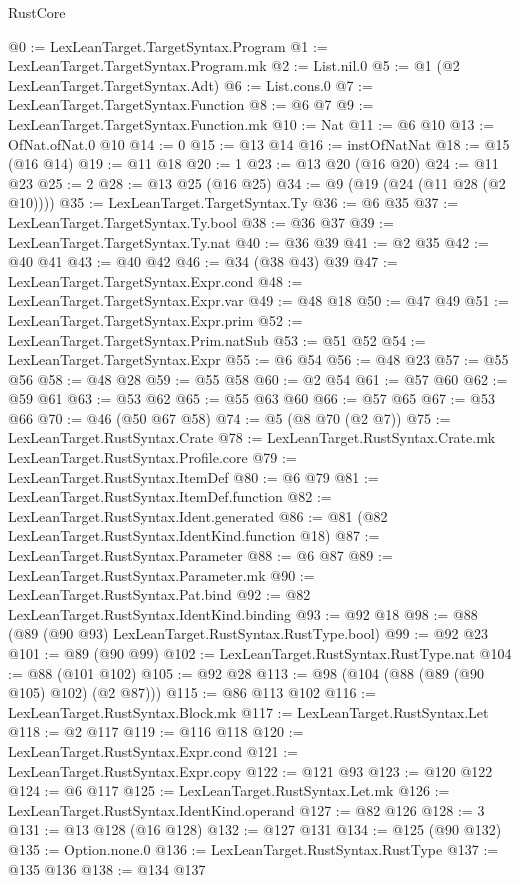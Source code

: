 \begin{lexlean}{RustCore}
\begin{coremodule}
@0 := LexLeanTarget.TargetSyntax.Program
@1 := LexLeanTarget.TargetSyntax.Program.mk
@2 := List.nil.{0}
@5 := @1 (@2 LexLeanTarget.TargetSyntax.Adt)
@6 := List.cons.{0}
@7 := LexLeanTarget.TargetSyntax.Function
@8 := @6 @7
@9 := LexLeanTarget.TargetSyntax.Function.mk
@10 := Nat
@11 := @6 @10
@13 := OfNat.ofNat.{0} @10
@14 := 0
@15 := @13 @14
@16 := instOfNatNat
@18 := @15 (@16 @14)
@19 := @11 @18
@20 := 1
@23 := @13 @20 (@16 @20)
@24 := @11 @23
@25 := 2
@28 := @13 @25 (@16 @25)
@34 := @9 (@19 (@24 (@11 @28 (@2 @10))))
@35 := LexLeanTarget.TargetSyntax.Ty
@36 := @6 @35
@37 := LexLeanTarget.TargetSyntax.Ty.bool
@38 := @36 @37
@39 := LexLeanTarget.TargetSyntax.Ty.nat
@40 := @36 @39
@41 := @2 @35
@42 := @40 @41
@43 := @40 @42
@46 := @34 (@38 @43) @39
@47 := LexLeanTarget.TargetSyntax.Expr.cond
@48 := LexLeanTarget.TargetSyntax.Expr.var
@49 := @48 @18
@50 := @47 @49
@51 := LexLeanTarget.TargetSyntax.Expr.prim
@52 := LexLeanTarget.TargetSyntax.Prim.natSub
@53 := @51 @52
@54 := LexLeanTarget.TargetSyntax.Expr
@55 := @6 @54
@56 := @48 @23
@57 := @55 @56
@58 := @48 @28
@59 := @55 @58
@60 := @2 @54
@61 := @57 @60
@62 := @59 @61
@63 := @53 @62
@65 := @55 @63 @60
@66 := @57 @65
@67 := @53 @66
@70 := @46 (@50 @67 @58)
@74 := @5 (@8 @70 (@2 @7))
@75 := LexLeanTarget.RustSyntax.Crate
@78 := LexLeanTarget.RustSyntax.Crate.mk LexLeanTarget.RustSyntax.Profile.core
@79 := LexLeanTarget.RustSyntax.ItemDef
@80 := @6 @79
@81 := LexLeanTarget.RustSyntax.ItemDef.function
@82 := LexLeanTarget.RustSyntax.Ident.generated
@86 := @81 (@82 LexLeanTarget.RustSyntax.IdentKind.function @18)
@87 := LexLeanTarget.RustSyntax.Parameter
@88 := @6 @87
@89 := LexLeanTarget.RustSyntax.Parameter.mk
@90 := LexLeanTarget.RustSyntax.Pat.bind
@92 := @82 LexLeanTarget.RustSyntax.IdentKind.binding
@93 := @92 @18
@98 := @88 (@89 (@90 @93) LexLeanTarget.RustSyntax.RustType.bool)
@99 := @92 @23
@101 := @89 (@90 @99)
@102 := LexLeanTarget.RustSyntax.RustType.nat
@104 := @88 (@101 @102)
@105 := @92 @28
@113 := @98 (@104 (@88 (@89 (@90 @105) @102) (@2 @87)))
@115 := @86 @113 @102
@116 := LexLeanTarget.RustSyntax.Block.mk
@117 := LexLeanTarget.RustSyntax.Let
@118 := @2 @117
@119 := @116 @118
@120 := LexLeanTarget.RustSyntax.Expr.cond
@121 := LexLeanTarget.RustSyntax.Expr.copy
@122 := @121 @93
@123 := @120 @122
@124 := @6 @117
@125 := LexLeanTarget.RustSyntax.Let.mk
@126 := LexLeanTarget.RustSyntax.IdentKind.operand
@127 := @82 @126
@128 := 3
@131 := @13 @128 (@16 @128)
@132 := @127 @131
@134 := @125 (@90 @132)
@135 := Option.none.{0}
@136 := LexLeanTarget.RustSyntax.RustType
@137 := @135 @136
@138 := @134 @137

\end{coremodule}
\end{lexlean}
